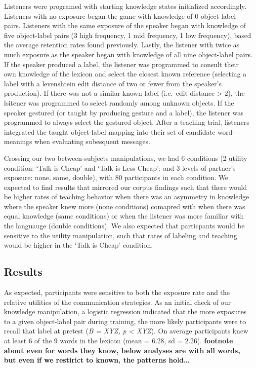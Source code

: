 \documentclass[10pt, letterpaper]{article}
\begin{document}
Listeners were programed with starting knowledge states initialized
accordingly. Listeners with no exposure began the game with knowledge of
0 object-label pairs. Listeners with the same exposure of the speaker
began with knowledge of five object-label pairs (3 high frequency, 1 mid
frequency, 1 low frequency), based the average retention rates found
previously. Lastly, the listener with twice as much exposure as the
speaker began with knowledge of all nine object-label pairs. If the
speaker produced a label, the listener was programmed to consult their
own knowledge of the lexicon and select the closest known reference
(selecting a label with a levenshtein edit distance of two or fewer from
the speaker's production). If there was not a similar known label
(i.e.~edit distance \textgreater{} 2), the lsitener was programmed to
select randomly among unknown objects. If the speaker gestured (or
taught by producing gesture and a label), the listener was programmed to
always select the gestured object. After a teaching trial, listeners
integrated the taught object-label mapping into their set of candidate
word-meanings when evaluating subesquent messages.

Crossing our two between-subjects manipulations, we had 6 conditions (2
utility condition: `Talk is Cheap' and `Talk is Less Cheap'; and 3
levels of partner's exposure: none, same, double), with 80 participants
in each condition. We expected to find results that mirrored our corpus
findings such that there would be higher rates of teaching behavior when
there was an asymmetry in knowledge where the speaker knew more (none
conditions) comapred with when there was equal knowledge (same
conditions) or when the listener was more familiar with the languauge
(double conditions). We also expected that particpants would be
sensitive to the utility manipulation, such that rates of labeling and
teaching would be higher in the `Talk is Cheap' condition.

\subsection{Results}\label{results-1}

As expected, participants were sensitive to both the exposure rate and
the relative utilities of the communication strategies. As an initial
check of our knowledge manipulation, a logistic regression indicated
that the more exposures to a given object-label pair during training,
the more likely participants were to recall that label at pretest
(\emph{B = XYZ, p \textless{} XYZ}). On average participants knew at
least 6 of the 9 words in the lexicon (mean = 6.28, sd = 2.26).
\textbf{footnote about even for words they know, below analyses are with
all words, but even if we restirict to known, the patterns hold\ldots{}}
\end{document}
